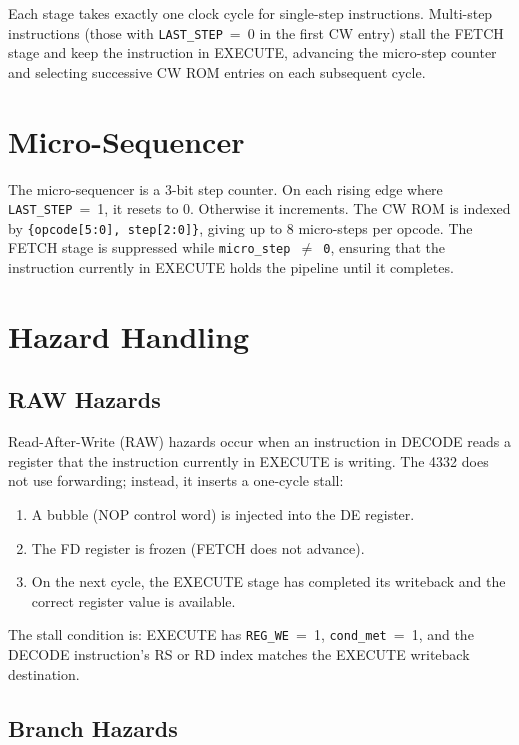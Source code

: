 \documentclass[a4paper,12pt]{report}
\newcommand{\field}[1]{\texttt{\small #1}}
\begin{document}
Each stage takes exactly one clock cycle for single-step instructions. Multi-step instructions (those with \field{LAST\_STEP}~=~0 in the first CW entry) stall the FETCH stage and keep the instruction in EXECUTE, advancing the micro-step counter and selecting successive CW ROM entries on each subsequent cycle.

\section{Micro-Sequencer}

The micro-sequencer is a 3-bit step counter. On each rising edge where \field{LAST\_STEP}~=~1, it resets to 0. Otherwise it increments. The CW ROM is indexed by \texttt{\{opcode[5:0], step[2:0]\}}, giving up to 8 micro-steps per opcode. The FETCH stage is suppressed while \texttt{micro\_step~$\neq$~0}, ensuring that the instruction currently in EXECUTE holds the pipeline until it completes.

\section{Hazard Handling}

\subsection{RAW Hazards}

Read-After-Write (RAW) hazards occur when an instruction in DECODE reads a register that the instruction currently in EXECUTE is writing. The 4332 does not use forwarding; instead, it inserts a one-cycle stall:

\begin{enumerate}
    \item A bubble (NOP control word) is injected into the DE register.
    \item The FD register is frozen (FETCH does not advance).
    \item On the next cycle, the EXECUTE stage has completed its writeback and the correct register value is available.
\end{enumerate}

The stall condition is: EXECUTE has \field{REG\_WE}~=~1, \field{cond\_met}~=~1, and the DECODE instruction's RS or RD index matches the EXECUTE writeback destination.

\subsection{Branch Hazards}
\end{document}
